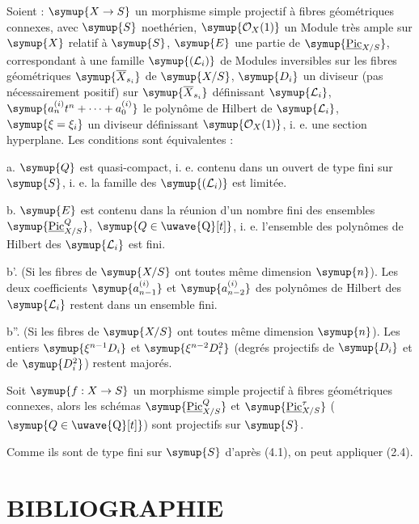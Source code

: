  Soient : $\symup{X\to S}$ un morphisme simple projectif à fibres géométriques connexes, avec
$\symup{S}$ noethérien, $\symup{\mathcal O_X(1)}$ un Module très ample sur $\symup{X}$ relatif à $\symup{S}$,
$\symup{E}$ une partie de $\symup{\underline{\operatorname{Pic}}_{X/S}}$, correspondant à une famille
$\symup{(\mathcal L_i)}$ de Modules inversibles sur les fibres géométriques
$\symup{\overline X_{s_i}}$ de $\symup{X/S}$, $\symup{D_i}$ un diviseur (pas nécessairement positif)
sur $\symup{\overline X_{s_i}}$ définissant $\symup{\mathcal L_i}$, $\symup{a_n^{(i)}t^n+\cdots+a_0^{(i)}}$ le polynôme de Hilbert de $\symup{\mathcal L_i}$, $\symup{\xi=\xi_i}$ un diviseur définissant
$\symup{\mathcal O_X(1)}$, i. e. une section hyperplane. Les conditions sont
équivalentes :

\noindent a. $\symup{Q}$ est quasi-compact, i. e. contenu dans un ouvert de type fini
sur $\symup{S}$, i. e. la famille des $\symup{(\mathcal L_i)}$ est limitée.

\noindent b. $\symup{E}$ est contenu dans la réunion d'un nombre fini des ensembles
$\symup{\underline{\operatorname{Pic}}_{X/S}^Q}$, $\symup{Q\in\text{\uwave{Q}}[t]}$, i. e. l'ensemble des
polynômes de Hilbert des $\symup{\mathcal L_i}$ est fini.

\noindent b'. (Si les fibres de $\symup{X/S}$ ont toutes même dimension $\symup{n}$). Les deux
coefficients $\symup{a_{n-1}^{(i)}}$ et $\symup{a_{n-2}^{(i)}}$ des polynômes de Hilbert des
$\symup{\mathcal L_i}$ restent dans un ensemble fini.


\noindent b''. (Si les fibres de $\symup{X/S}$ ont toutes même dimension $\symup{n}$). Les entiers
$\symup{\xi^{n-1}D_i}$ et $\symup{\xi^{n-2}D_i^2}$ (degrés projectifs de $\symup{D_i}$ et de $\symup{D_i^2}$) restent majorés.

 Soit $\symup{f:X\to S}$ un morphisme simple
projectif à fibres géométriques connexes, alors les schémas
$\symup{\underline{\operatorname{Pic}}_{X/S}^Q}$ et $\symup{\underline{\operatorname{Pic}}_{X/S}^\tau}$
($\symup{Q\in\text{\uwave{Q}}[t]}$) sont projectifs sur $\symup{S}$.

Comme ils sont de type fini sur $\symup{S}$ d'après (4.1), on peut appliquer (2.4).

\section*{\normalfont BIBLIOGRAPHIE}

